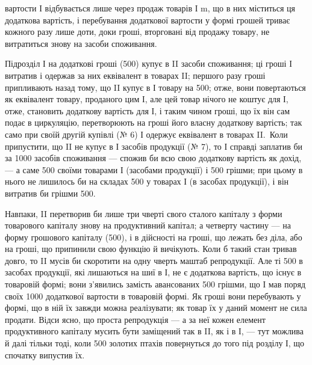 \parcont{}  %
вартости І відбувається лише через продаж товарів І m, що в них
міститься ця додаткова вартість, і перебування додаткової вартости у
формі грошей триває кожного разу лише доти, доки гроші, вторговані
від продажу товару, не витратиться знову на засоби споживання.

Підрозділ І на додаткові гроші (500) купує в II засоби
споживання; ці гроші І витратив і одержав за них еквівалент в товарах II;
першого разу гроші припливають назад тому, що II купує в І товару
на 500; отже, вони повертаються як еквівалент товару, проданого
цим І, але цей товар нічого не коштує для І, отже, становить додаткову
вартість для І, і таким чином гроші, що їх він сам
подає в циркуляцію, перетворюють на гроші його
власну додаткову вартість; так само при своїй другій купівлі
(№ 6) І одержує еквівалент в товарах II.~Коли припустити, що II не
купує в І засобів продукції (№ 7), то І справді заплатив би за 1000 засобів споживання — спожив би всю свою додаткову вартість як
дохід, — а саме 500 своїми товарами І (засобами продукції) і 500 грішми;
при цьому в нього не лишилось би на складах 500 у товарах І
(в засобах продукції), і він витратив би грішми 500.

Навпаки, II перетворив би лише три чверті свого сталого капіталу
з форми товарового капіталу знову на продуктивний капітал; а четверту
частину — на форму грошового капіталу (500), і в дійсності на
гроші, що лежать без діла, або на гроші, що припинили свою функцію
й вичікують. Коли б такий стан тривав довго, то II мусів би скоротити
на одну чверть маштаб репродукції. Але ті 500 в засобах продукції,
які лишаються на шиї в І, не є додаткова вартість, що існує в товаровій
формі; вони з’явились замість авансованих 500 грішми, що І мав
поряд своїх 1000 додаткової вартости в товаровій формі. Як
гроші вони перебувають у формі, що в ній їх завжди можна реалізувати;
як товар їх у даний момент не сила продати. Відси ясно, що проста
репродукція — а за неї кожен елемент продуктивного капіталу мусить бути
заміщений так в II, як і в І, — тут можлива й далі тільки тоді, коли 500 золотих
$пт$ахів повернуться до того під розділу І, що спочатку випустив їх.

